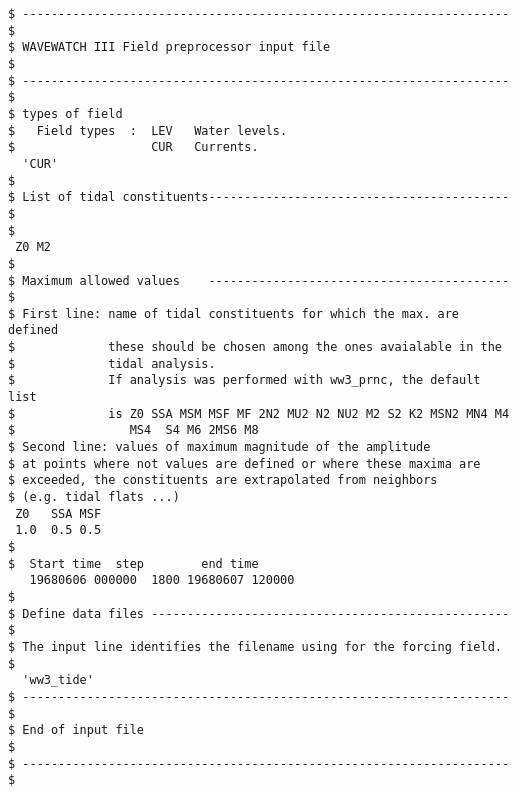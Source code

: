 \begin{footnotesize}
\begin{verbatim}
$ -------------------------------------------------------------------- $
$ WAVEWATCH III Field preprocessor input file                          $
$ -------------------------------------------------------------------- $
$ types of field
$   Field types  :  LEV   Water levels.
$                   CUR   Currents.
  'CUR'
$
$ List of tidal constituents------------------------------------------ $
$
 Z0 M2         
$
$ Maximum allowed values    ------------------------------------------ $
$ First line: name of tidal constituents for which the max. are defined
$             these should be chosen among the ones avaialable in the 
$             tidal analysis. 
$             If analysis was performed with ww3_prnc, the default list 
$             is Z0 SSA MSM MSF MF 2N2 MU2 N2 NU2 M2 S2 K2 MSN2 MN4 M4 
$                MS4  S4 M6 2MS6 M8  
$ Second line: values of maximum magnitude of the amplitude 
$ at points where not values are defined or where these maxima are 
$ exceeded, the constituents are extrapolated from neighbors 
$ (e.g. tidal flats ...) 
 Z0   SSA MSF 
 1.0  0.5 0.5 
$
$  Start time  step        end time
   19680606 000000  1800 19680607 120000
$
$ Define data files -------------------------------------------------- $
$ The input line identifies the filename using for the forcing field.
$
  'ww3_tide'
$ -------------------------------------------------------------------- $
$ End of input file                                                    $
$ -------------------------------------------------------------------- $
\end{verbatim}
\end{footnotesize}
